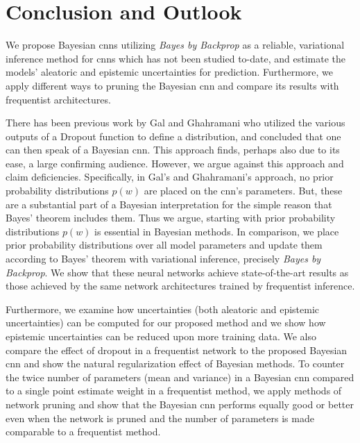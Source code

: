 \chapter{Conclusion and Outlook}

We propose Bayesian \acp{cnn} utilizing \textit{Bayes by Backprop} as a reliable, variational inference method for \acp{cnn} which has not been studied to-date, and estimate the models' aleatoric and epistemic uncertainties for prediction. Furthermore, we apply different ways to pruning the Bayesian \ac{cnn} and compare its results with frequentist architectures.


\newline There has been previous work by Gal and Ghahramani \cite{gal2015bayesian} who utilized the various outputs of a Dropout function to define a distribution, and concluded that one can then speak of a Bayesian \ac{cnn}. This approach finds, perhaps also due to its ease, a large confirming audience. However, we argue against this approach and claim deficiencies. Specifically, in Gal's and Ghahramani's \cite{gal2015bayesian} approach, no prior probability distributions $p(w)$ are placed on the \ac{cnn}'s parameters. But, these are a substantial part of a Bayesian interpretation for the simple reason that Bayes' theorem includes them. Thus we argue, starting with prior probability distributions $p(w)$ is essential in Bayesian methods. In comparison, we place prior probability distributions over all model parameters and update them according to Bayes' theorem with variational inference, precisely \textit{Bayes by Backprop}. We show that these neural networks achieve state-of-the-art results as those achieved by the same network architectures trained by frequentist inference. 


\newline Furthermore, we examine how uncertainties (both aleatoric and epistemic uncertainties) can be computed for our proposed method and we show how epistemic uncertainties can be reduced upon more training data. We also compare the effect of dropout in a frequentist network to the proposed Bayesian \ac{cnn} and show the natural regularization effect of Bayesian methods. To counter the twice number of parameters (mean and variance) in a Bayesian \ac{cnn} compared to a single point estimate weight in a frequentist method, we apply methods of network pruning and show that the Bayesian \ac{cnn} performs equally good or better even when the network is pruned and the number of parameters is made comparable to a frequentist method. 


